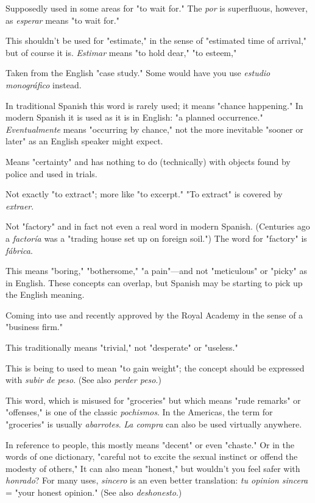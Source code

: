  Supposedly used in some areas for "to wait
for." The \emph{por} is superfluous, however, as \emph{esperar} means "to wait for."

 This shouldn't be used for "estimate," in the sense
of "estimated time of arrival," but of course it is. \emph{Estimar} means "to
hold dear," "to esteem,"

 Taken from the English "case study."
Some would have you use \emph{estudio monográfico} instead.

 In traditional Spanish this word is rarely used; it
means "chance happening." In modern Spanish it is used as it is in
English: "a planned occurrence." \emph{Eventualmente} means "occurring
by chance," not the more inevitable "sooner or later" as an English
speaker might expect.

 Means "certainty" and has nothing to do (technically) with objects found by police and used in trials.

 Not exactly "to extract"; more like "to excerpt."
"To extract" is covered by \emph{extraer}.

 Not "factory" and in fact not even a real word in
modern Spanish. (Centuries ago a \emph{factoría} was a "trading house set up
on foreign soil.") The word for "factory" is \emph{fábrica}.

 This means "boring," "bothersome," "a pain"---and not "meticulous" or "picky" as in English. These concepts can
overlap, but Spanish may be starting to pick up the English meaning.

 Coming into use and recently approved by the Royal
Academy in the sense of a "business firm."

 This traditionally means "trivial," not "desperate" or
"useless."

 This is being to used to mean "to gain
weight"; the concept should be expressed with \emph{subir de peso}. (See
also \emph{perder peso}.)

 This word, which is misused for "groceries" but
which means "rude remarks" or "offenses," is one of the classic \emph{pochismos}. In the Americas, the term for "groceries" is usually \emph{abarrotes}. \emph{La compra} can also be used virtually anywhere.

 In reference to people, this mostly means "decent"
or even "chaste." Or in the words of one dictionary, "careful not to excite the sexual instinct or offend the modesty of others," It can also
mean "honest," but wouldn't you feel safer with \emph{honrado}? For many
uses, \emph{sincero} is an even better translation: \emph{tu opinion sincera} = "your
honest opinion." (See also \emph{deshonesto}.)

